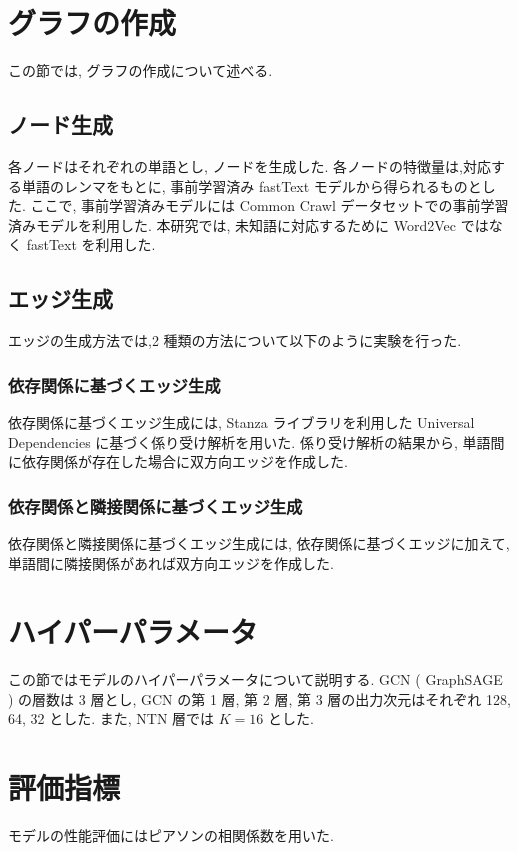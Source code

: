\documentclass[a4j,twoside,12pt]{thesis} %
\begin{document}
\section{グラフの作成}
この節では, グラフの作成について述べる.

\subsection{ノード生成}
各ノードはそれぞれの単語とし, ノードを生成した.
各ノードの特徴量は,対応する単語のレンマをもとに, 事前学習済み fastText\cite{bojanowski2017enriching} モデルから得られるものとした.
ここで, 事前学習済みモデルには Common Crawl データセットでの事前学習済みモデルを利用した.
本研究では, 未知語に対応するために Word2Vec ではなく fastText を利用した.

\subsection{エッジ生成}
エッジの生成方法では,2 種類の方法について以下のように実験を行った.
\subsubsection{依存関係に基づくエッジ生成}
依存関係に基づくエッジ生成には, Stanza\cite{qi2020stanza} ライブラリを利用した Universal Dependencies に基づく係り受け解析を用いた.
係り受け解析の結果から, 単語間に依存関係が存在した場合に双方向エッジを作成した.

\subsubsection{依存関係と隣接関係に基づくエッジ生成}
依存関係と隣接関係に基づくエッジ生成には, 依存関係に基づくエッジに加えて, 単語間に隣接関係があれば双方向エッジを作成した.

\section{ハイパーパラメータ}
この節ではモデルのハイパーパラメータについて説明する.
GCN \cite{kipf2017semi} ( GraphSAGE \cite{hamilton2017inductive} ) の層数は 3 層とし, GCN の第 1 層, 第 2 層, 第 3 層の出力次元はそれぞれ 128, 64, 32 とした. また, NTN 層では $K=16$ とした.

\section{評価指標}
モデルの性能評価にはピアソンの相関係数を用いた.
\end{document}
